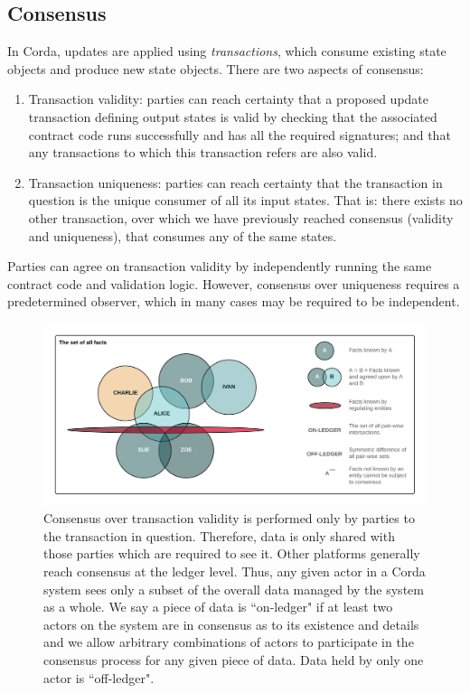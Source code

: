 \documentclass{article}
\begin{document}
\subsection{Consensus}
In Corda, updates are applied using \textit{transactions}, which consume existing state objects and produce new state objects. There are two aspects of consensus:
\begin{enumerate}
\item{Transaction validity: parties can reach certainty that a proposed update transaction defining output states is valid by checking that the associated contract code runs successfully and has all the required signatures; and that any transactions to which this transaction refers are also valid.}
\item{Transaction uniqueness: parties can reach certainty that the transaction in question is the unique consumer of all its input states. That is: there exists no other transaction, over which we have previously reached consensus (validity and uniqueness), that consumes any of the same states.}
\end{enumerate}

Parties can agree on transaction validity by independently running the same contract code and validation logic. However, consensus over uniqueness requires a predetermined observer, which in many cases may be required to be independent.

\begin{figure}[H]
    \includegraphics[scale = .5, center]{Consensus}
    \caption{Consensus over transaction validity is performed only by parties to the transaction in question. Therefore, data is only shared with those parties which are required to see it. Other platforms generally reach consensus at the ledger level. Thus, any given actor in a Corda system sees only a subset of the overall data managed by the system as a whole. We say a piece of data is ``on-ledger" if at least two actors on the system are in consensus as to its existence and details and we allow arbitrary combinations of actors to participate in the consensus process for any given piece of data. Data held by only one actor is ``off-ledger".}
\end{figure}
\end{document}

